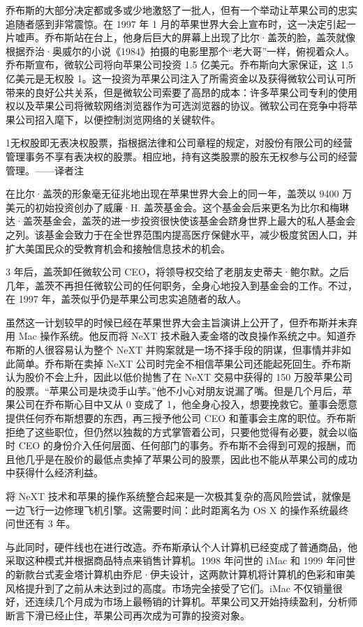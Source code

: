 \documentclass[12pt,UTF8]{ctexbook}
\begin{document}
乔布斯的大部分决定都或多或少地激怒了一批人，但有一个举动让苹果公司的忠实追随者感到非常震惊。在 1997 年 1 月的苹果世界大会上宣布时，这一决定引起一片嘘声。乔布斯站在台上，他身后巨大的屏幕上出现了比尔·盖茨的脸，盖茨就像根据乔治·奥威尔的小说《1984》拍摄的电影里那个“老大哥”一样，俯视着众人。乔布斯宣布，微软公司将向苹果公司投资 1.5 亿美元。乔布斯向大家保证，这 1.5 亿美元是无权股 1。这一投资为苹果公司注入了所需资金以及获得微软公司认可所带来的良好公共关系，但是微软公司索要了高昂的成本：许多苹果公司专利的使用权以及苹果公司将微软网络浏览器作为可选浏览器的协议。微软公司在竞争中将苹果公司招入麾下，以便控制浏览网络的关键软件。

1无权股即无表决权股票，指根据法律和公司章程的规定，对股份有限公司的经营管理事务不享有表决权的股票。相应地，持有这类股票的股东无权参与公司的经营管理。——译者注

在比尔·盖茨的形象毫无征兆地出现在苹果世界大会上的同一年，盖茨以 9400 万美元的初始投资创办了威廉·H. 盖茨基金会。这个基金会后来更名为比尔和梅琳达·盖茨基金会，盖茨的进一步投资很快使该基金会跻身世界上最大的私人基金会之列。该基金会致力于在全世界范围内提高医疗保健水平，减少极度贫困人口，并扩大美国民众的受教育机会和接触信息技术的机会。

3 年后，盖茨卸任微软公司 CEO，将领导权交给了老朋友史蒂夫·鲍尔默。之后几年，盖茨不再担任微软公司的任何职务，全身心地投入到基金会的工作。不过，在 1997 年，盖茨似乎仍是苹果公司忠实追随者的敌人。

虽然这一计划较早的时候已经在苹果世界大会主旨演讲上公开了，但乔布斯并未弃用 Mac 操作系统。他反而将 NeXT 技术融入麦金塔的改良操作系统之中。知道乔布斯的人很容易认为整个 NeXT 并购案就是一场不择手段的阴谋，但事情并非如此简单。乔布斯在卖掉 NeXT 公司时完全不相信苹果公司还能起死回生。乔布斯认为股价不会上升，因此以低价抛售了在 NeXT 交易中获得的 150 万股苹果公司的股票。“苹果公司是块烫手山芋。”他不小心对朋友说漏了嘴。但是几个月后，苹果公司在乔布斯心目中又从 0 变成了 1，他全身心投入，想要挽救它。董事会愿意提供任何乔布斯想要的东西，再三授予他公司 CEO 和董事会主席的职位。乔布斯拒绝了这些职位，但仍然以独裁的方式掌管着公司，只要他觉得有必要，就会以临时 CEO 的身份介入任何层面、任何部门的事务。乔布斯不会得到可观的报酬，而且他几乎是在股价的最低点卖掉了苹果公司的股票，因此也不能从苹果公司的成功中获得什么经济利益。

将 NeXT 技术和苹果的操作系统整合起来是一次极其复杂的高风险尝试，就像是一边飞行一边修理飞机引擎。这需要时间：此时距离名为 OS X 的操作系统最终问世还有 3 年。

与此同时，硬件线也在进行改造。乔布斯承认个人计算机已经变成了普通商品，他采取这种模式并根据商品特点来销售计算机。1998 年问世的 iMac 和 1999 年问世的新款台式麦金塔计算机由乔尼·伊夫设计，这两款计算机将计算机的色彩和审美风格提升到了之前从未达到过的高度。市场完全接受了它们。iMac 不仅销量很好，还连续几个月成为市场上最畅销的计算机。苹果公司又开始持续盈利，分析师断言下滑已经止住，苹果公司再次成为可靠的投资对象。
\end{document}
